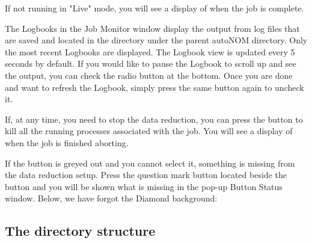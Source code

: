  \noindent{}
  
If not running in "Live" mode, you will see a display of  when the job is complete.

The Logbooks in the Job Monitor window display the output from log files that are saved and located in the  directory under the parent autoNOM directory. Only the most recent Logbooks are displayed. The Logbook view is updated every 5 seconds by default. If you would like to pause the Logbook to scroll up and see the output, you can check the  radio button at the bottom. Once you are done and want to refresh the Logbook, simply press the same button again to uncheck it.

If, at any time, you need to stop the data reduction, you can press the  button to kill all the running processes associated with the job. You will see a display of  when the job is finished aborting.

If the  button is greyed out and you cannot select it, something is missing from the data reduction setup. Press the question mark button located beside the  button and you will be shown what is missing in the pop-up Button Status window. Below, we have forgot the Diamond background:

  \noindent{}
  
\subsection{The directory structure}

